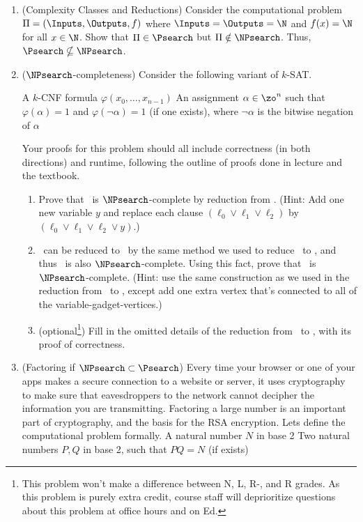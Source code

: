 \documentclass[11pt]{article}
\begin{document}
\begin{enumerate}
    \item (Complexity Classes and Reductions)
        Consider the computational problem $\Pi = (\Inputs,\Outputs,f)$ where $\Inputs=\Outputs=\N$ and $f(x)=\N$ for all $x\in \N$.  Show that $\Pi\in \Psearch$ but $\Pi\notin \NPsearch$.  Thus, $\Psearch\nsubseteq\NPsearch$.

    \item ($\NPsearch$-completeness) Consider the following variant of $k$-SAT.

       \compprob{\FlipkSAT}
        {A $k$-CNF formula $\varphi(x_0,\ldots,x_{n-1})$}
        {An assignment $\alpha\in\zo^n$ such that $\varphi(\alpha)=1$ and $\varphi(\neg \alpha)=1$ (if one exists), where $\neg \alpha$ is the bitwise negation of $\alpha$}

        Your proofs for this problem should all include correctness (in both directions) and runtime, following the outline of proofs done in lecture and the textbook.

        \begin{enumerate}
        \item Prove that \FlipFourSAT\ is $\NPsearch$-complete by reduction from \ThreeSAT.  (Hint: Add one new variable $y$ and replace each clause $(\ell_0 \vee \ell_1 \vee \ell_2)$ by $(\ell_0 \vee \ell_1 \vee \ell_2 \vee y)$.)
        \item \FlipFourSAT\ can be reduced to \FlipThreeSAT\ by the same method we used to reduce \SAT\ to \ThreeSAT, and thus \FlipThreeSAT\ is also $\NPsearch$-complete.  Using this fact,
        prove that \GraphThreeColoring\ is $\NPsearch$-complete. (Hint: use the same construction as we used in the reduction from \ThreeSAT\ to \IndependentSet, except add one extra vertex that's connected to all of the variable-gadget-vertices.)
        \item (optional\footnote{This problem won't make a difference between N, L, R-, and R grades. As this problem is purely extra credit, course staff will deprioritize questions about this problem at office hours and on Ed.}) Fill in the omitted details of the reduction from \FlipFourSAT\ to \FlipThreeSAT, with its proof of correctness.
\end{enumerate}

\item (Factoring if $\NPsearch\subset \Psearch$) Every time your browser or one of your apps makes a secure connection to a website or server, it uses cryptography to make sure that eavesdroppers to the network cannot decipher the information you are transmitting. Factoring a large number is an important part of cryptography, and the basis for the RSA encryption. Lets define the computational problem formally.
\compprob{\Factoring}
        {A natural number $N$ in base 2}
        {Two natural numbers $P,Q$ in base 2, such that $PQ=N$ (if exists)}


\end{enumerate}
\end{document}
